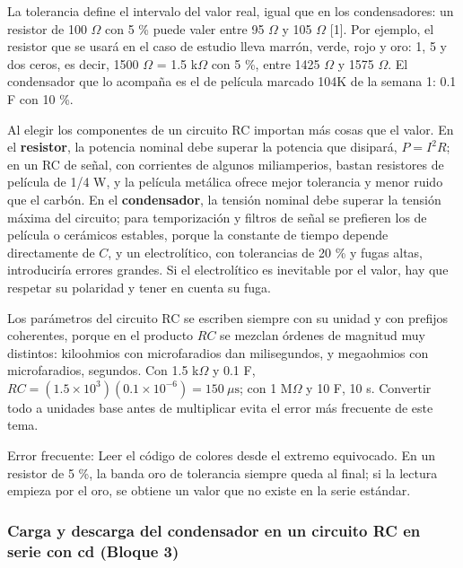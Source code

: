 \documentclass[11pt,letterpaper]{article}
\begin{document}
La tolerancia define el intervalo del valor real, igual que en los condensadores: un resistor de 100 \ensuremath{\Omega} con \textpm{}5 \% puede valer entre 95 \ensuremath{\Omega} y 105 \ensuremath{\Omega} [1]. Por ejemplo, el resistor que se usará en el caso de estudio lleva marrón, verde, rojo y oro: 1, 5 y dos ceros, es decir, 1500 \ensuremath{\Omega} = 1.5 k\ensuremath{\Omega} con \textpm{}5 \%, entre 1425 \ensuremath{\Omega} y 1575 \ensuremath{\Omega}. El condensador que lo acompaña es el de película marcado 104K de la semana 1: 0.1 \textmu{}F con \textpm{}10 \%.

Al elegir los componentes de un circuito RC importan más cosas que el valor. En el \textbf{resistor}, la potencia nominal debe superar la potencia que disipará, $P = I^2 R$; en un RC de señal, con corrientes de algunos miliamperios, bastan resistores de película de 1/4 W, y la película metálica ofrece mejor tolerancia y menor ruido que el carbón. En el \textbf{condensador}, la tensión nominal debe superar la tensión máxima del circuito; para temporización y filtros de señal se prefieren los de película o cerámicos estables, porque la constante de tiempo depende directamente de $C$, y un electrolítico, con tolerancias de \textpm{}20 \% y fugas altas, introduciría errores grandes. Si el electrolítico es inevitable por el valor, hay que respetar su polaridad y tener en cuenta su fuga.

Los parámetros del circuito RC se escriben siempre con su unidad y con prefijos coherentes, porque en el producto $RC$ se mezclan órdenes de magnitud muy distintos: kiloohmios con microfaradios dan milisegundos, y megaohmios con microfaradios, segundos. Con 1.5 k\ensuremath{\Omega} y 0.1 \textmu{}F, $RC = (1.5 \times 10^3)(0.1 \times 10^{-6}) = 150\ \mu\text{s}$; con 1 M\ensuremath{\Omega} y 10 \textmu{}F, 10 s. Convertir todo a unidades base antes de multiplicar evita el error más frecuente de este tema.

\begin{nota}{Error frecuente:}
Leer el código de colores desde el extremo equivocado. En un resistor de \textpm{}5 \%, la banda oro de tolerancia siempre queda al final; si la lectura empieza por el oro, se obtiene un valor que no existe en la serie estándar.
\end{nota}

\subsubsection{Carga y descarga del condensador en un circuito RC en serie con cd (Bloque 3)}
\end{document}
